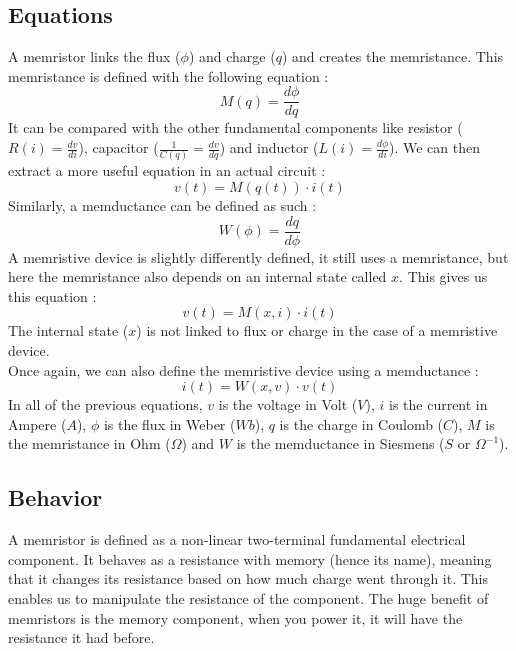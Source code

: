 \subsection{Equations}
A memristor links the flux ($\phi$) and charge ($q$) and creates the memristance.
This memristance is defined with the following equation :
\begin{equation}
  M(q)=\frac{d\phi}{dq}
\end{equation}
It can be compared with the other fundamental components like resistor ($R(i)=\frac{dv}{di}$), capacitor ($\frac{1}{C(q)}=\frac{dv}{dq}$) and inductor ($L(i)=\frac{d\phi}{di}$).
We can then extract a more useful equation in an actual circuit :
\begin{equation}
  v(t)=M(q(t))\cdot i(t)
\end{equation}
Similarly, a memductance can be defined as such :
\begin{equation}
  W(\phi)=\frac{dq}{d\phi}
\end{equation}
A memristive device is slightly differently defined, it still uses a memristance, but here the memristance also depends on an internal state called $x$. This gives us this equation :
\begin{equation}
  v(t)=M(x,i)\cdot i(t)
\end{equation}
The internal state ($x$) is not linked to flux or charge in the case of a memristive device.\\
Once again, we can also define the memristive device using a memductance :
\begin{equation}
  i(t)=W(x,v)\cdot v(t)
\end{equation}
In all of the previous equations, $v$ is the voltage in Volt ($V$), $i$ is the current in Ampere ($A$), $\phi$ is the flux in Weber ($Wb$), $q$ is the charge in Coulomb ($C$), $M$ is the memristance in Ohm ($\Omega$) and $W$ is the memductance in Siesmens ($S$ or $\Omega^{-1}$).

\subsection{Behavior}
A memristor is defined as a non-linear two-terminal fundamental electrical component. It behaves as a resistance with memory (hence its name), meaning that it changes its resistance based on how much charge went through it. This enables us to manipulate the resistance of the component.
The huge benefit of memristors is the memory component, when you power it, it will have the resistance it had before.

